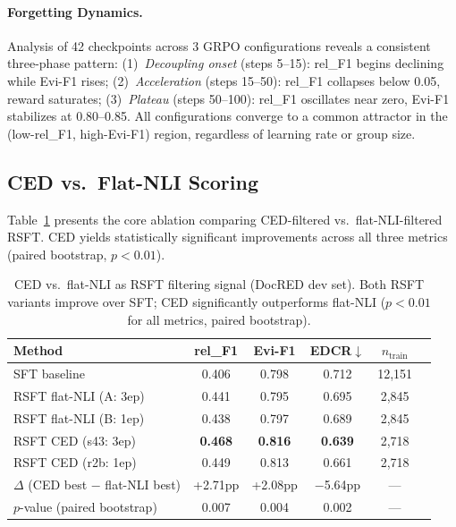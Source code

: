 \documentclass[11pt,a4paper]{article}
\newcommand{\ced}{CED}
\newcommand{\edcr}{EDCR}
\newcommand{\rsft}{RSFT}
\begin{document}
\paragraph{Forgetting Dynamics.}
Analysis of 42 checkpoints across 3 GRPO configurations reveals a consistent three-phase pattern: (1)~\emph{Decoupling onset} (steps 5--15): rel\_F1 begins declining while Evi-F1 rises; (2)~\emph{Acceleration} (steps 15--50): rel\_F1 collapses below 0.05, reward saturates; (3)~\emph{Plateau} (steps 50--100): rel\_F1 oscillates near zero, Evi-F1 stabilizes at 0.80--0.85.
All configurations converge to a common attractor in the (low-rel\_F1, high-Evi-F1) region, regardless of learning rate or group size.

\subsection{\ced{} vs.\ Flat-NLI Scoring}
\label{sec:ced_vs_flatnli}

Table~\ref{tab:ced_ablation} presents the core ablation comparing \ced{}-filtered vs.\ flat-NLI-filtered \rsft{}.
\ced{} yields statistically significant improvements across all three metrics (paired bootstrap, $p < 0.01$).

\begin{table}[t]
\centering
\small
\caption{CED vs.\ flat-NLI as \rsft{} filtering signal (DocRED dev set). Both \rsft{} variants improve over SFT; CED significantly outperforms flat-NLI ($p < 0.01$ for all metrics, paired bootstrap).}
\label{tab:ced_ablation}
\begin{tabular}{@{}lccccc@{}}
\toprule
\textbf{Method} & \textbf{rel\_F1} & \textbf{Evi-F1} & \textbf{\edcr{}$\downarrow$} & \textbf{$n_{\text{train}}$} \\
\midrule
SFT baseline                    & 0.406 & 0.798 & 0.712 & 12,151 \\
\rsft{} flat-NLI (A: 3ep)       & 0.441 & 0.795 & 0.695 & 2,845 \\
\rsft{} flat-NLI (B: 1ep)       & 0.438 & 0.797 & 0.689 & 2,845 \\
\rsft{} CED (s43: 3ep)          & \textbf{0.468} & \textbf{0.816} & \textbf{0.639} & 2,718 \\
\rsft{} CED (r2b: 1ep)          & 0.449 & 0.813 & 0.661 & 2,718 \\
\midrule
$\Delta$ (CED best $-$ flat-NLI best)  & +2.71pp & +2.08pp & $-$5.64pp & --- \\
$p$-value (paired bootstrap)           & 0.007 & 0.004 & 0.002 & --- \\
\bottomrule
\end{tabular}
\end{table}
\end{document}
